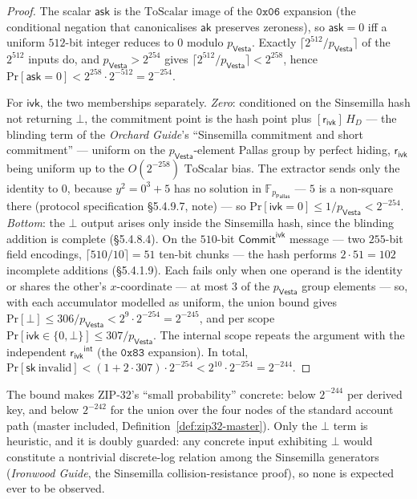 \documentclass[11pt,a4paper]{article}
\theoremstyle{definition}
\newcommand{\F}{\mathbb{F}}
\renewcommand{\Pr}{\mathrm{Pr}}
\newcommand{\Pallas}{\ensuremath{\mathsf{Pallas}}}
\newcommand{\Vesta}{\ensuremath{\mathsf{Vesta}}}
\newcommand{\CommitIvk}{\ensuremath{\mathsf{Commit}^{\mathsf{ivk}}}}
\newcommand{\ask}{\ensuremath{\mathsf{ask}}}
\newcommand{\aksym}{\ensuremath{\mathsf{ak}}}
\newcommand{\ivk}{\ensuremath{\mathsf{ivk}}}
\newcommand{\rivk}{\ensuremath{\mathsf{r_{ivk}}}}
\begin{document}
\begin{proof}
The scalar $\ask$ is the $\mathrm{ToScalar}$ image of the $\mathtt{0x06}$
expansion (the conditional negation that canonicalises $\aksym$ preserves
zeroness), so $\ask = 0$ iff a uniform $512$-bit integer reduces to $0$
modulo $p_{\Vesta}$. Exactly $\lceil 2^{512}/p_{\Vesta} \rceil$ of the
$2^{512}$ inputs do, and $p_{\Vesta} > 2^{254}$ gives
$\lceil 2^{512}/p_{\Vesta} \rceil < 2^{258}$, hence
$\Pr[\ask = 0] < 2^{258} \cdot 2^{-512} = 2^{-254}$.

For $\ivk$, the two memberships separately. \emph{Zero}: conditioned on
the Sinsemilla hash not returning $\bot$, the commitment point is the hash
point plus $[\rivk]\,H_D$ --- the blinding term of the \emph{Orchard
Guide}'s ``Sinsemilla commitment and short commitment'' --- uniform on the
$p_{\Vesta}$-element Pallas group by perfect hiding, $\rivk$ being uniform
up to the $O(2^{-258})$ $\mathrm{ToScalar}$ bias. The extractor sends only
the identity to $0$, because $y^2 = 0^3 + 5$ has no solution in
$\F_{p_{\Pallas}}$ --- $5$ is a non-square there (protocol specification
\S5.4.9.7, note) --- so $\Pr[\ivk = 0] \le 1/p_{\Vesta} < 2^{-254}$.
\emph{Bottom}: the $\bot$ output arises only inside the Sinsemilla hash,
since the blinding addition is complete (\S5.4.8.4). On the $510$-bit
$\CommitIvk$ message --- two $255$-bit field encodings,
$\lceil 510/10 \rceil = 51$ ten-bit chunks --- the hash performs
$2 \cdot 51 = 102$ incomplete additions (\S5.4.1.9). Each fails only when
one operand is the identity or shares the other's $x$-coordinate --- at
most $3$ of the $p_{\Vesta}$ group elements --- so, with each accumulator
modelled as uniform, the union bound gives
$\Pr[\bot] \le 306/p_{\Vesta} < 2^{9} \cdot 2^{-254} = 2^{-245}$, and per
scope $\Pr[\ivk \in \{0, \bot\}] \le 307/p_{\Vesta}$. The internal scope
repeats the argument with the independent $\rivk^{\mathsf{int}}$ (the
$\mathtt{0x83}$ expansion). In total,
$\Pr[\mathsf{sk}\ \text{invalid}] < (1 + 2 \cdot 307) \cdot 2^{-254} <
2^{10} \cdot 2^{-254} = 2^{-244}$.
\end{proof}

The bound makes ZIP-32's ``small probability'' concrete: below $2^{-244}$
per derived key, and below $2^{-242}$ for the union over the four nodes of
the standard account path (master included,
Definition~\ref{def:zip32-master}). Only the $\bot$ term is heuristic, and
it is doubly guarded: any concrete input exhibiting $\bot$ would
constitute a nontrivial discrete-log relation among the Sinsemilla
generators (\emph{Ironwood Guide}, the Sinsemilla collision-resistance
proof), so none is expected ever to be observed.
\end{document}
